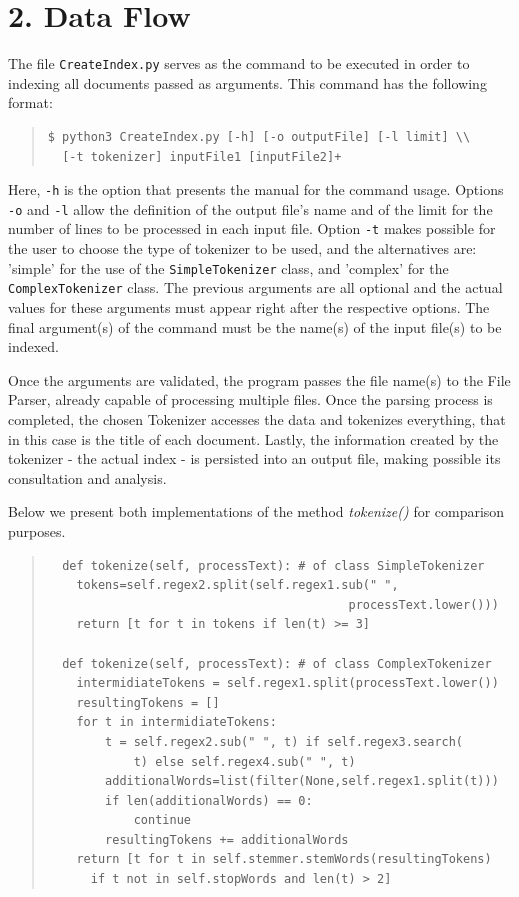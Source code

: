 \documentclass[12pt]{article}
\begin{document}
\newpage
\section*{2. Data Flow}

The file \texttt{CreateIndex.py} serves as the command to be executed in order to 
indexing all documents passed as arguments.
This command has the following format:

\begin{quote}
\begin{verbatim}
$ python3 CreateIndex.py [-h] [-o outputFile] [-l limit] \\
  [-t tokenizer] inputFile1 [inputFile2]+
\end{verbatim}
\end{quote}

Here, \texttt{-h} is the option that presents the manual for the command usage.
Options \texttt{-o} and \texttt{-l} allow the definition of the output file's 
name and of the limit for the number of lines to be processed in each input file.
Option \texttt{-t} makes possible for the user to choose the type of tokenizer
to be used, and the alternatives are: 'simple' for the use of the 
\texttt{SimpleTokenizer} class, and 'complex' for the \texttt{ComplexTokenizer} class.
The previous arguments are all optional and the actual values for these arguments
must appear right after the respective options.
The final argument(s) of the command must be the name(s) of the input file(s) to
be indexed.

Once the arguments are validated, the program passes the file name(s) to the 
File Parser, already capable of processing multiple files. 
Once the parsing process is completed, the chosen Tokenizer accesses the 
data and tokenizes everything, that in this case is the title of each 
document.
Lastly, the information created by the tokenizer - the actual index - is 
persisted into an output file, making possible its consultation and analysis.

Below we present both implementations of the method {\it tokenize()\/} for
comparison purposes.

\begingroup
\addtolength\leftmargini{-0.4in}
\addtolength\baselineskip{-0.05in}
\begin{quote}
\begin{verbatim}
  def tokenize(self, processText): # of class SimpleTokenizer
    tokens=self.regex2.split(self.regex1.sub(" ", 
                                          processText.lower()))
    return [t for t in tokens if len(t) >= 3]

  def tokenize(self, processText): # of class ComplexTokenizer
    intermidiateTokens = self.regex1.split(processText.lower())
    resultingTokens = []
    for t in intermidiateTokens:
        t = self.regex2.sub(" ", t) if self.regex3.search(
            t) else self.regex4.sub(" ", t)
        additionalWords=list(filter(None,self.regex1.split(t)))
        if len(additionalWords) == 0:
            continue
        resultingTokens += additionalWords
    return [t for t in self.stemmer.stemWords(resultingTokens) 
      if t not in self.stopWords and len(t) > 2]
\end{verbatim}
\end{quote}
\endgroup
\end{document}
